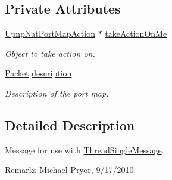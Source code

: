 \subsection*{Private Attributes}
\begin{DoxyCompactItemize}
\item 
\hypertarget{class_thread_message_item_set_port_map_description_a2dd35dc3624f47b32bf2b4942e5601bb}{
\hyperlink{class_upnp_nat_port_map_action}{UpnpNatPortMapAction} $\ast$ \hyperlink{class_thread_message_item_set_port_map_description_a2dd35dc3624f47b32bf2b4942e5601bb}{takeActionOnMe}}
\label{class_thread_message_item_set_port_map_description_a2dd35dc3624f47b32bf2b4942e5601bb}

\begin{DoxyCompactList}\small\item\em Object to take action on. \item\end{DoxyCompactList}\item 
\hyperlink{class_packet}{Packet} \hyperlink{class_thread_message_item_set_port_map_description_a3555b193e1583eda3c822b8c7f9d2026}{description}
\begin{DoxyCompactList}\small\item\em Description of the port map. \item\end{DoxyCompactList}\end{DoxyCompactItemize}


\subsection{Detailed Description}
Message for use with \hyperlink{class_thread_single_message}{ThreadSingleMessage}. \begin{DoxyRemark}{Remarks}
Michael Pryor, 9/17/2010. 
\end{DoxyRemark}


